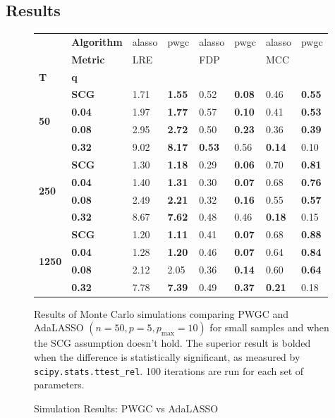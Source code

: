 \documentclass{statsoc}
\begin{document}
\subsection{Results}
\begin{figure}[!h]
  \centering
  \caption{Simulation Results: PWGC vs AdaLASSO}
  \label{tab:simulation_table}

  \begin{tabular}{|ll||ll|ll|ll|}
    \toprule
    &\textbf{Algorithm}&alasso&pwgc&alasso&pwgc&alasso&pwgc\\
    &\textbf{Metric}&LRE&&FDP&&MCC&\\
    \textbf{T}&\textbf{q}&&&&&&\\
    \midrule
    \multirow{4}{*}{\textbf{50}}
    &\textbf{SCG}&1.71&\textbf{1.55}&0.52&\textbf{0.08}&0.46&\textbf{0.55}\\
    &\textbf{0.04}&1.97&\textbf{1.77}&0.57&\textbf{0.10}&0.41&\textbf{0.53}\\
    &\textbf{0.08}&2.95&\textbf{2.72}&0.50&\textbf{0.23}&0.36&\textbf{0.39}\\
    &\textbf{0.32}&9.02&\textbf{8.17}&\textbf{0.53}&0.56&\textbf{0.14}&0.10\\
    \midrule
    \multirow{4}{*}{\textbf{250}}
    &\textbf{SCG}&1.30&\textbf{1.18}&0.29&\textbf{0.06}&0.70&\textbf{0.81}\\
    &\textbf{0.04}&1.40&\textbf{1.31}&0.30&\textbf{0.07}&0.68&\textbf{0.76}\\
    &\textbf{0.08}&2.49&\textbf{2.21}&0.32&\textbf{0.16}&0.55&\textbf{0.57}\\
    &\textbf{0.32}&8.67&\textbf{7.62}&0.48&0.46&\textbf{0.18}&0.15\\
    \midrule
    \multirow{4}{*}{\textbf{1250}}
    &\textbf{SCG}&1.20&\textbf{1.11}&0.41&\textbf{0.07}&0.68&\textbf{0.88}\\
    &\textbf{0.04}&1.28&\textbf{1.20}&0.46&\textbf{0.07}&0.64&\textbf{0.84}\\
    &\textbf{0.08}&2.12&2.05&0.36&\textbf{0.14}&0.60&\textbf{0.64}\\
    &\textbf{0.32}&7.78&\textbf{7.39}&0.49&\textbf{0.37}&\textbf{0.21}&0.18\\
    \bottomrule
  \end{tabular}

  {\footnotesize Results of Monte Carlo simulations comparing PWGC and
    AdaLASSO $(n = 50, p = 5, p_{\text{max}} = 10)$ for small
    samples and when the SCG assumption doesn't hold.  The superior
    result is bolded when the difference is statistically
    significant, as measured by \texttt{scipy.stats.ttest\_rel}.
    100 iterations are run for each
    set of parameters.\\

}
\end{figure}
\end{document}

